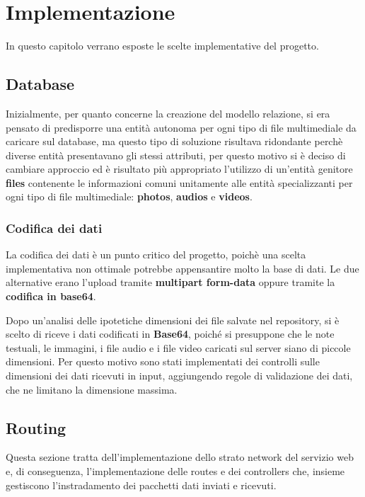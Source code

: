 \chapter{Implementazione}

In questo capitolo verrano esposte le scelte implementative del progetto.

\section{Database}
Inizialmente, per quanto concerne la creazione del modello relazione, si era pensato di predisporre una entità autonoma per ogni tipo di file multimediale da caricare sul database, ma questo tipo di soluzione risultava ridondante perchè diverse entità presentavano gli stessi attributi, per questo motivo si è deciso di cambiare approccio ed è risultato più appropriato l'utilizzo di un'entità genitore \textbf{files} contenente le informazioni comuni unitamente alle entità specializzanti per ogni tipo di file multimediale: \textbf{photos}, \textbf{audios} e \textbf{videos}. 

\subsection{Codifica dei dati}
La codifica dei dati è un punto critico del progetto, poichè una scelta implementativa non ottimale potrebbe appensantire molto la base di dati.
Le due alternative erano l'upload tramite \textbf{multipart form-data} oppure tramite la \textbf{codifica in base64}.

Dopo un'analisi delle ipotetiche dimensioni dei file salvate nel repository, si è scelto di riceve i dati codificati in \textbf{Base64}, poiché si presuppone che le note testuali, le immagini, i file audio e i file video caricati sul server siano di piccole dimensioni. Per questo motivo sono stati implementati dei controlli sulle dimensioni dei dati ricevuti in input, aggiungendo regole di validazione dei dati, che ne limitano la dimensione massima.

\section{Routing}

Questa sezione tratta dell'implementazione dello strato network del servizio web e, di conseguenza, l'implementazione delle routes e dei controllers che, insieme gestiscono l'instradamento dei pacchetti dati inviati e ricevuti. 

